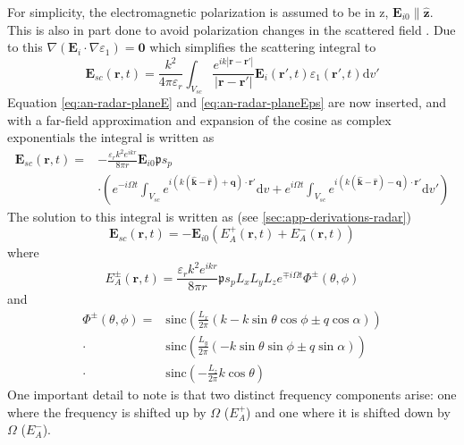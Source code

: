 \documentclass[11pt,twoside]{eitExjobb}
\begin{document}
	For simplicity, the electromagnetic polarization is assumed to be in z, $\bm{E}_{i0} \parallel \bm{\hat{z}}$. This is also in part done to avoid polarization changes in the scattered field \cite{Korpel1988}. Due to this $\nabla(\bm{E}_i \cdot \nabla \varepsilon_1) = \bm{0}$ which simplifies the scattering integral to
	\begin{equation*}
		\bm{E}_{sc}(\bm{r},t) = \frac{k^2}{4\pi\varepsilon_r} \int_{V_{sc}} \frac{e^{ik |\bm{r}-\bm{r'}| }}{ |\bm{r}-\bm{r'}|} \bm{E}_i (\bm{r'},t) \varepsilon_1 (\bm{r'},t) \mathrm{d}v'
	\end{equation*}
	Equation \eqref{eq:an-radar-planeE} and \eqref{eq:an-radar-planeEps} are now inserted, and with a far-field approximation and expansion of the cosine as complex exponentials the integral is written as
	\begin{equation*}
	\begin{split}
		\bm{E}_{sc}(\bm{r},t) =& -\frac{\varepsilon_rk^2 e^{ikr}}{8\pi r} \bm{E}_{i0} \mathfrak{p} s_p \\
		&\cdot \left( e^{-i\Omega t} \int_{V_{sc}} e^{i( k(\bm{\hat{k}} - \bm{\hat{r}}) + \bm{q} ) \cdot \bm{r}'} \mathrm{d}v + e^{i\Omega t} \int_{V_{sc}} e^{i( k(\bm{\hat{k}} - \bm{\hat{r}}) - \bm{q} ) \cdot \bm{r}'} \mathrm{d}v' \right)
	\end{split}
	\end{equation*}
	The solution to this integral is written as (see \ref{sec:app-derivations-radar})
	\begin{equation*}
		\bm{E}_{sc} (\bm{r},t) = -\bm{E}_{i0} \left( E_A^+ (\bm{r},t) + E_A^- (\bm{r},t) \right)
	\end{equation*}
	where
	\begin{equation*}
		E_A^\pm (\bm{r},t) = \frac{\varepsilon_rk^2 e^{ikr}}{8\pi r} \mathfrak{p} s_p L_x L_y L_z e^{\mp i\Omega t} \Phi^\pm (\theta,\phi)
	\end{equation*}
	and
	\begin{equation*}
	\begin{split}
		\Phi^\pm(\theta,\phi) =& \text{sinc} \left( \frac{L_x}{2\pi} \left( k - k\sin{\theta}\cos{\phi} \pm q\cos{\alpha} \right) \right) \\
		\cdot& \text{sinc} \left( \frac{L_y}{2\pi} \left( -k\sin{\theta}\sin{\phi} \pm q\sin{\alpha} \right) \right) \\
		\cdot& \text{sinc} \left( -\frac{L_z}{2\pi} k\cos{\theta} \right)
	\end{split}
	\end{equation*}
	One important detail to note is that two distinct frequency components arise: one where the frequency is shifted up by $\Omega$ ($E_A^+$) and one where it is shifted down by $\Omega$ ($E_A^-$).
	
\end{document}
